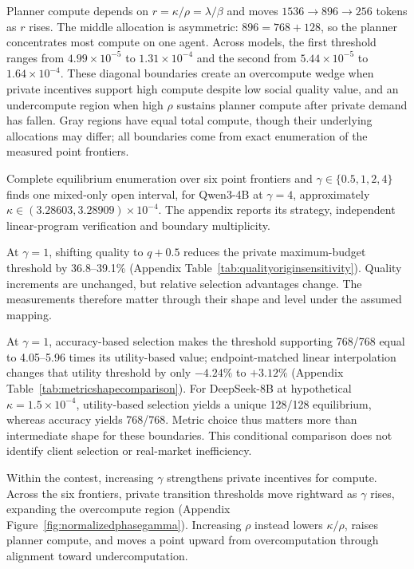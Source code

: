 \documentclass{article}
\begin{document}
Planner compute depends on $r=\kappa/\rho=\lambda/\beta$ and moves $1536\to896\to256$ tokens as $r$ rises. The middle allocation is asymmetric: $896=768+128$, so the planner concentrates most compute on one agent. Across models, the first threshold ranges from $4.99\times10^{-5}$ to $1.31\times10^{-4}$ and the second from $5.44\times10^{-5}$ to $1.64\times10^{-4}$. These diagonal boundaries create an overcompute wedge when private incentives support high compute despite low social quality value, and an undercompute region when high $\rho$ sustains planner compute after private demand has fallen. Gray regions have equal total compute, though their underlying allocations may differ; all boundaries come from exact enumeration of the measured point frontiers.

Complete equilibrium enumeration over six point frontiers and $\gamma\in\{0.5,1,2,4\}$ finds one mixed-only open interval, for Qwen3-4B at $\gamma=4$, approximately $\kappa\in(3.28603,3.28909)\times10^{-4}$. The appendix reports its strategy, independent linear-program verification and boundary multiplicity.

At $\gamma=1$, shifting quality to $q+0.5$ reduces the private maximum-budget threshold by 36.8--39.1\% (Appendix Table~\ref{tab:qualityoriginsensitivity}). Quality increments are unchanged, but relative selection advantages change. The measurements therefore matter through their shape and level under the assumed mapping.

At $\gamma=1$, accuracy-based selection makes the threshold supporting 768/768 equal to 4.05--5.96 times its utility-based value; endpoint-matched linear interpolation changes that utility threshold by only $-4.24\%$ to $+3.12\%$ (Appendix Table~\ref{tab:metricshapecomparison}). For DeepSeek-8B at hypothetical $\kappa=1.5\times10^{-4}$, utility-based selection yields a unique 128/128 equilibrium, whereas accuracy yields 768/768. Metric choice thus matters more than intermediate shape for these boundaries. This conditional comparison does not identify client selection or real-market inefficiency.

Within the contest, increasing $\gamma$ strengthens private incentives for compute. Across the six frontiers, private transition thresholds move rightward as $\gamma$ rises, expanding the overcompute region (Appendix Figure~\ref{fig:normalizedphasegamma}). Increasing $\rho$ instead lowers $\kappa/\rho$, raises planner compute, and moves a point upward from overcomputation through alignment toward undercomputation.
\end{document}
